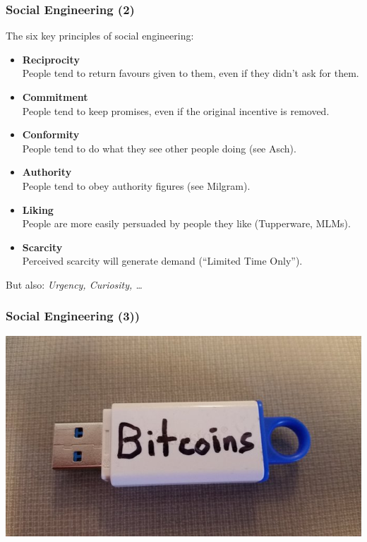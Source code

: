 \documentclass[aspectratio=169,dvipsnames]{beamer}
\begin{document}
\begin{frame}
\frametitle{Social Engineering (2)}
The six key principles of social engineering:
\bigskip

\begin{minipage}{0.5\textwidth}
\begin{itemize}
\pause\item\textbf{Reciprocity}\\People tend to return favours given to them, even if they didn't ask for them.
\pause\item\textbf{Commitment}\\People tend to keep promises, even if the original incentive is removed.
\pause\item\textbf{Conformity}\\People tend to do what they see other people doing (see Asch).
\end{itemize}
\end{minipage}%
\begin{minipage}{0.5\textwidth}
\begin{itemize}
\pause\item\textbf{Authority}\\People tend to obey authority figures (see Milgram).
\pause\item\textbf{Liking}\\People are more easily persuaded by people they like (Tupperware, MLMs).
\pause\item\textbf{Scarcity}\\Perceived scarcity will generate demand (``Limited Time Only'').
\end{itemize}
\end{minipage}
\bigskip

\begin{center}
But also: \emph{Urgency, Curiosity, \dots}
\end{center}
\end{frame}

\begin{frame}
\frametitle{Social Engineering (3))}
\begin{center}
\includegraphics[scale=0.375]{images/bait} 
\end{center}
\end{frame}
\end{document}
